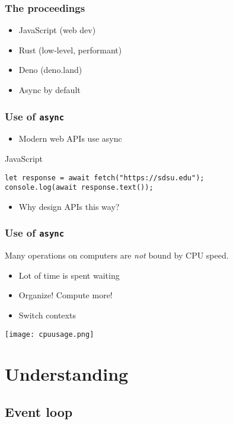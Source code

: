 \documentclass{beamer}
\begin{document}
\begin{frame}
	\frametitle{The proceedings}
	\begin{itemize}
		\item JavaScript (web dev)
		\item Rust (low-level, performant)
		\item Deno (deno.land)
		\item Async by default
	\end{itemize}
\end{frame}

\begin{frame}[fragile]
	\frametitle{Use of \texttt{async}}
	\begin{itemize}
		\item Modern web APIs use async
	\end{itemize}
\begin{block}{JavaScript}
	\begin{verbatim}
let response = await fetch("https://sdsu.edu");
console.log(await response.text());
	\end{verbatim}
\end{block}
	\begin{itemize}
		\item Why design APIs this way?
	\end{itemize}
\end{frame}

\begin{frame}
	\frametitle{Use of \texttt{async}}
	Many operations on computers are \emph{not} bound by CPU speed.
	\begin{itemize}
		\item Lot of time is spent waiting
		\item Organize! Compute more!
		\item Switch contexts
	\end{itemize}
	\texttt{[image: cpuusage.png]}
\end{frame}

\section{Understanding}

\subsection{Event loop}
\end{document}
